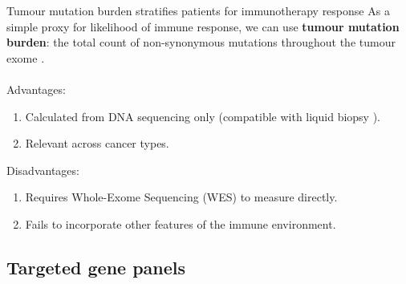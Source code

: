 \documentclass{beamer}
\begin{document}
\begin{frame}{Tumour mutation burden stratifies patients for immunotherapy response}
As a simple proxy for likelihood of immune response, we can use \textbf{tumour mutation burden}: the total count of non-synonymous mutations throughout the tumour exome \citep{zhu_association_2019, cao_high_2019}. \\
~\\
Advantages:
\begin{enumerate}[I]
    \item Calculated from DNA sequencing only (compatible with liquid biopsy \citep{gandara_blood-based_2018}).
    \item Relevant across cancer types.
\end{enumerate}
Disadvantages:
\begin{enumerate}[I]
    \item Requires Whole-Exome Sequencing (WES) to measure directly. 
    \item Fails to incorporate other features of the immune environment.
\end{enumerate}



\end{frame}

\subsection{Targeted gene panels}
\end{document}

